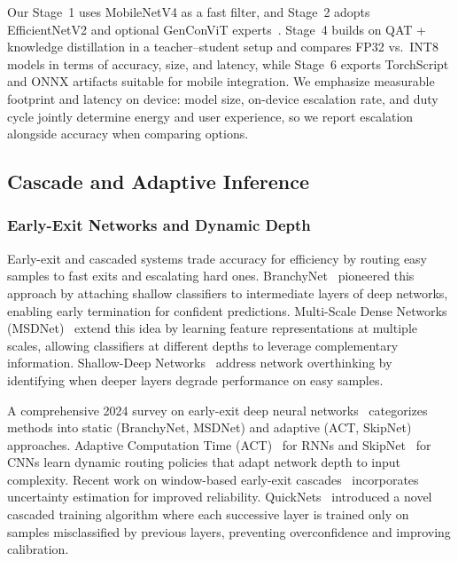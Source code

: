 Our Stage~1 uses MobileNetV4 as a fast filter, and Stage~2 adopts EfficientNetV2 and optional GenConViT experts~\cite{efficientnetv2,genconvit_github}. Stage~4 builds on QAT + knowledge distillation in a teacher–student setup and compares FP32 vs.\ INT8 models in terms of accuracy, size, and latency, while Stage~6 exports TorchScript and ONNX artifacts suitable for mobile integration. We emphasize measurable footprint and latency on device: model size, on\hyp device escalation rate, and duty cycle jointly determine energy and user experience, so we report escalation alongside accuracy when comparing options.

\subsection*{Cascade and Adaptive Inference}

\subsubsection*{Early-Exit Networks and Dynamic Depth}
Early\hyp exit and cascaded systems trade accuracy for efficiency by routing easy samples to fast exits and escalating hard ones. BranchyNet~\cite{teerapittayanon2017branchynet} pioneered this approach by attaching shallow classifiers to intermediate layers of deep networks, enabling early termination for confident predictions. Multi\hyp Scale Dense Networks (MSDNet)~\cite{huang2018msdnet} extend this idea by learning feature representations at multiple scales, allowing classifiers at different depths to leverage complementary information. Shallow\hyp Deep Networks~\cite{kaya2019shallowdeep} address network overthinking by identifying when deeper layers degrade performance on easy samples.

A comprehensive 2024 survey on early\hyp exit deep neural networks~\cite{han2024earlyexit_survey} categorizes methods into static (BranchyNet, MSDNet) and adaptive (ACT, SkipNet) approaches. Adaptive Computation Time (ACT)~\cite{graves2016act} for RNNs and SkipNet~\cite{wang2018skipnet} for CNNs learn dynamic routing policies that adapt network depth to input complexity. Recent work on window\hyp based early\hyp exit cascades~\cite{xia2023window_cascade} incorporates uncertainty estimation for improved reliability. QuickNets~\cite{han2022quicknets} introduced a novel cascaded training algorithm where each successive layer is trained only on samples misclassified by previous layers, preventing overconfidence and improving calibration.

